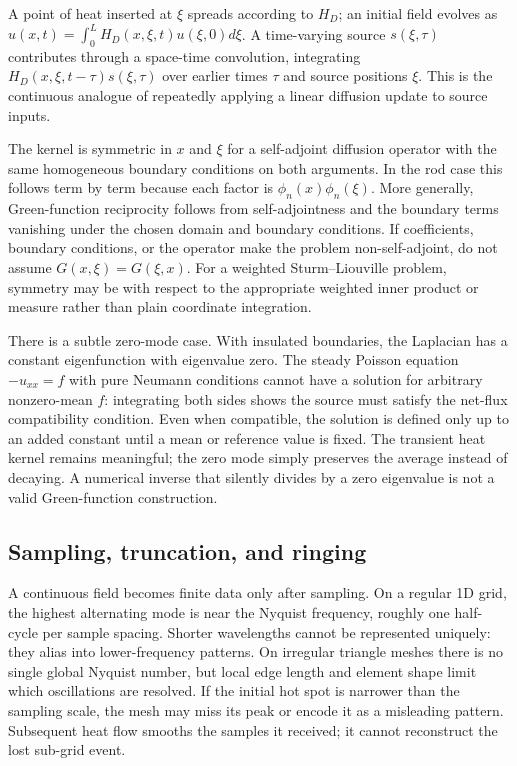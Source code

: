A point of heat inserted at \(\xi\) spreads according to \(H_D\); an initial field evolves as \(u(x,t)=\int_0^LH_D(x,\xi,t)u(\xi,0)d\xi\). A time-varying source \(s(\xi,\tau)\) contributes through a space-time convolution, integrating \(H_D(x,\xi,t-\tau)s(\xi,\tau)\) over earlier times \(\tau\) and source positions \(\xi\). This is the continuous analogue of repeatedly applying a linear diffusion update to source inputs.

The kernel is symmetric in \(x\) and \(\xi\) for a self-adjoint diffusion operator with the same homogeneous boundary conditions on both arguments. In the rod case this follows term by term because each factor is \(\phi_n(x)\phi_n(\xi)\). More generally, Green-function reciprocity follows from self-adjointness and the boundary terms vanishing under the chosen domain and boundary conditions. If coefficients, boundary conditions, or the operator make the problem non-self-adjoint, do not assume \(G(x,\xi)=G(\xi,x)\). For a weighted Sturm--Liouville problem, symmetry may be with respect to the appropriate weighted inner product or measure rather than plain coordinate integration.

There is a subtle zero-mode case. With insulated boundaries, the Laplacian has a constant eigenfunction with eigenvalue zero. The steady Poisson equation \(-u_{xx}=f\) with pure Neumann conditions cannot have a solution for arbitrary nonzero-mean \(f\): integrating both sides shows the source must satisfy the net-flux compatibility condition. Even when compatible, the solution is defined only up to an added constant until a mean or reference value is fixed. The transient heat kernel remains meaningful; the zero mode simply preserves the average instead of decaying. A numerical inverse that silently divides by a zero eigenvalue is not a valid Green-function construction.

\subsection{Sampling, truncation, and ringing}\label{04-visual-computing-ii-ch030-sampling-truncation-and-ringing}

A continuous field becomes finite data only after sampling. On a regular 1D grid, the highest alternating mode is near the Nyquist frequency, roughly one half-cycle per sample spacing. Shorter wavelengths cannot be represented uniquely: they alias into lower-frequency patterns. On irregular triangle meshes there is no single global Nyquist number, but local edge length and element shape limit which oscillations are resolved. If the initial hot spot is narrower than the sampling scale, the mesh may miss its peak or encode it as a misleading pattern. Subsequent heat flow smooths the samples it received; it cannot reconstruct the lost sub-grid event.

